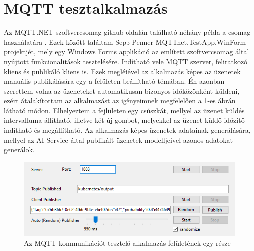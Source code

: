 \section{MQTT tesztalkalmazás}
Az MQTT.NET szoftvercsomag github oldalán található néhány példa a csomag használatára \cite{mqttnet-examples}.
Ezek között találtam Sepp Penner MQTTnet.TestApp.WinForm \cite{mqttnet-winforms} projektjét, 
mely egy Windows Forms applikáció az említett szoftvercsomag által nyújtott funkcionalitások tesztelésére.
Indítható vele MQTT szerver, feliratkozó kliens és publikáló kliens is.
Ezek meglétével az alkalmazás képes az üzenetek manuális publikálására egy a felületen beállítható témában.
Én azonban szerettem volna az üzeneteket automatikusan bizonyos időközönként küldeni,
ezért átalakítottam az alkalmazást az igényeimnek megfelelően a \ref{fig:mqtt-tester}-es ábrán látható módon.
Elhelyeztem a fejlületen egy csúszkát, mellyel az üzenet küldés intervalluma állítható, illetve két új gombot,
melyekkel az üzenet küldő időzítő indítható és megállítható.
Az alkalmazás képes üzenetek adatainak generálására, mellyel az AI Service által publikált üzenetek modelljeivel azonos adatokat generálok.
\begin{figure}[!ht]
    \centering
    \includegraphics[width=150mm, keepaspectratio]{figures/MQTT-Tester.png}
    \caption{Az MQTT kommunikációt tesztelő alkalmazás felületének egy része}
    \label{fig:mqtt-tester}
\end{figure}
